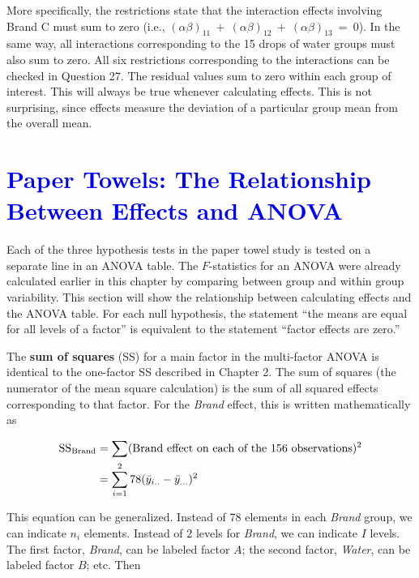 \documentclass[
]{report}
\begin{document}
More specifically, the restrictions state that the interaction effects involving Brand C must sum to zero (i.e., \(\scriptstyle (\alpha\beta)_{11} \ +\  (\alpha\beta)_{12} \ +\  (\alpha\beta)_{13} \ =\  0\)). In the same way, all interactions corresponding to the 15 drops of water groups must also sum to zero. All six restrictions corresponding to the interactions can be checked in Question 27. The residual values sum to zero within each group of interest. This will always be true whenever calculating effects. This is not surprising, since effects measure the deviation of a particular group mean from the overall mean.

\hypertarget{section-45}{%
\section{\texorpdfstring{\textcolor{blue}{Paper Towels: The Relationship Between Effects and ANOVA}}{}}\label{section-45}}

Each of the three hypothesis tests in the paper towel study is tested on a separate line in an ANOVA table. The \(\scriptstyle F\)-statistics for an ANOVA were already calculated earlier in this chapter by comparing between group and within group variability. This section will show the relationship between calculating effects and the ANOVA table. For each null hypothesis, the statement ``the means are equal for all levels of a factor'' is equivalent to the statement ``factor effects are zero.''

The \textbf{sum of squares} (SS) for a main factor in the multi-factor ANOVA is identical to the one-factor SS described in Chapter 2. The sum of squares (the numerator of the mean square calculation) is the sum of all squared effects corresponding to that factor. For the \emph{Brand} effect, this is written mathematically as

\begin{align}
\text{SS}_{\text{Brand}} &= \sum (\text{Brand effect on each of the 156 observations})^2 \notag \\
&= \sum_{i=1}^{2} 78(\bar{y}_{i..} - \bar{y}_{...})^2
\notag
\end{align}

This equation can be generalized. Instead of 78 elements in each \emph{Brand} group, we can indicate \(\scriptstyle n_i\) elements. Instead of 2 levels for \emph{Brand}, we can indicate \(\scriptstyle I\) levels. The first factor, \emph{Brand}, can be labeled factor \(\scriptstyle A\); the second factor, \emph{Water}, can be labeled factor \(\scriptstyle B\); etc. Then
\end{document}
